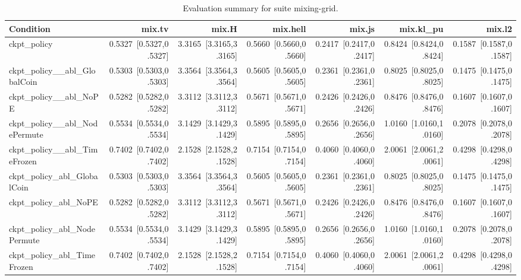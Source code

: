 \begin{table}[t]
\centering
\caption{Evaluation summary for suite mixing-grid.}
\label{tab:eval_mixing-grid}
\begin{tabular}{lrrrrrr}
\toprule
Condition & mix.tv & mix.H & mix.hell & mix.js & mix.kl\_pu & mix.l2 \\
\midrule
ckpt\_policy & 0.5327~[0.5327,0.5327] & 3.3165~[3.3165,3.3165] & 0.5660~[0.5660,0.5660] & 0.2417~[0.2417,0.2417] & 0.8424~[0.8424,0.8424] & 0.1587~[0.1587,0.1587] \\
ckpt\_policy\_\_abl\_GlobalCoin & 0.5303~[0.5303,0.5303] & 3.3564~[3.3564,3.3564] & 0.5605~[0.5605,0.5605] & 0.2361~[0.2361,0.2361] & 0.8025~[0.8025,0.8025] & 0.1475~[0.1475,0.1475] \\
ckpt\_policy\_\_abl\_NoPE & 0.5282~[0.5282,0.5282] & 3.3112~[3.3112,3.3112] & 0.5671~[0.5671,0.5671] & 0.2426~[0.2426,0.2426] & 0.8476~[0.8476,0.8476] & 0.1607~[0.1607,0.1607] \\
ckpt\_policy\_\_abl\_NodePermute & 0.5534~[0.5534,0.5534] & 3.1429~[3.1429,3.1429] & 0.5895~[0.5895,0.5895] & 0.2656~[0.2656,0.2656] & 1.0160~[1.0160,1.0160] & 0.2078~[0.2078,0.2078] \\
ckpt\_policy\_\_abl\_TimeFrozen & 0.7402~[0.7402,0.7402] & 2.1528~[2.1528,2.1528] & 0.7154~[0.7154,0.7154] & 0.4060~[0.4060,0.4060] & 2.0061~[2.0061,2.0061] & 0.4298~[0.4298,0.4298] \\
ckpt\_policy\_abl\_GlobalCoin & 0.5303~[0.5303,0.5303] & 3.3564~[3.3564,3.3564] & 0.5605~[0.5605,0.5605] & 0.2361~[0.2361,0.2361] & 0.8025~[0.8025,0.8025] & 0.1475~[0.1475,0.1475] \\
ckpt\_policy\_abl\_NoPE & 0.5282~[0.5282,0.5282] & 3.3112~[3.3112,3.3112] & 0.5671~[0.5671,0.5671] & 0.2426~[0.2426,0.2426] & 0.8476~[0.8476,0.8476] & 0.1607~[0.1607,0.1607] \\
ckpt\_policy\_abl\_NodePermute & 0.5534~[0.5534,0.5534] & 3.1429~[3.1429,3.1429] & 0.5895~[0.5895,0.5895] & 0.2656~[0.2656,0.2656] & 1.0160~[1.0160,1.0160] & 0.2078~[0.2078,0.2078] \\
ckpt\_policy\_abl\_TimeFrozen & 0.7402~[0.7402,0.7402] & 2.1528~[2.1528,2.1528] & 0.7154~[0.7154,0.7154] & 0.4060~[0.4060,0.4060] & 2.0061~[2.0061,2.0061] & 0.4298~[0.4298,0.4298] \\
\bottomrule
\end{tabular}
\end{table}
